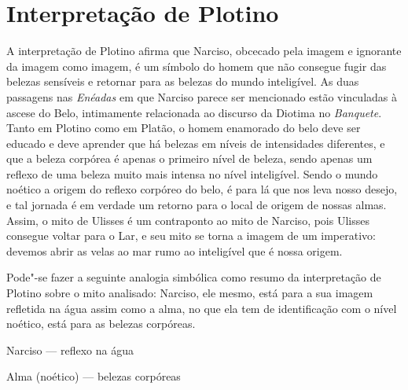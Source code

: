 \section{Interpretação de Plotino}

A interpretação de Plotino afirma que Narciso, obcecado pela imagem e
ignorante da imagem como imagem, é um símbolo do homem que não
consegue fugir das belezas sensíveis e retornar para as belezas do
mundo inteligível. As duas passagens nas \emph{Enéadas} em que
Narciso parece ser mencionado estão vinculadas à ascese do Belo,
intimamente relacionada ao discurso da Diotima no \emph{Banquete}.
Tanto em Plotino como em Platão, o homem enamorado do belo deve ser
educado e deve aprender que há belezas em níveis de intensidades
diferentes, e que a beleza corpórea é apenas o primeiro nível de
beleza, sendo apenas um reflexo de uma beleza muito mais intensa no
nível inteligível. Sendo o mundo noético a origem do reflexo corpóreo
do belo, é para lá que nos leva nosso desejo, e tal jornada é em
verdade um retorno para o local de origem de nossas almas. Assim, o
mito de Ulisses é um contraponto ao mito de Narciso, pois Ulisses
consegue voltar para o Lar, e seu mito se torna a imagem de um
imperativo: devemos abrir as velas ao mar rumo ao inteligível que é
nossa origem. 

Pode"-se fazer a seguinte analogia simbólica como resumo da
interpretação de Plotino sobre o mito analisado: Narciso, ele mesmo,
está para a sua imagem refletida na água assim como a alma, no que
ela tem de identificação com o nível noético, está para as belezas
corpóreas.

\begin{center}
Narciso --- reflexo na água

Alma (noético) --- belezas corpóreas
\end{center}

